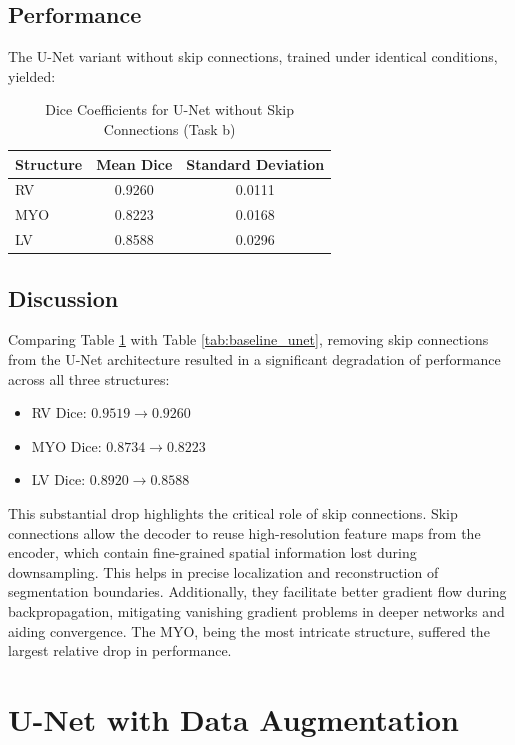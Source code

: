 \documentclass{article}
\begin{document}
\subsection{Performance}
The U-Net variant without skip connections, trained under identical conditions, yielded:
\begin{table}[H]
  \centering
  \caption{Dice Coefficients for U-Net without Skip Connections (Task b)}
  \label{tab:no_shortcut_unet}
  \begin{tabular}{lcc}
    \toprule
    Structure & Mean Dice & Standard Deviation \\
    \midrule
    RV        & 0.9260    & 0.0111             \\
    MYO       & 0.8223    & 0.0168             \\
    LV        & 0.8588    & 0.0296             \\
    \bottomrule
  \end{tabular}
\end{table}

\subsection{Discussion}
Comparing Table \ref{tab:no_shortcut_unet} with Table \ref{tab:baseline_unet}, removing skip connections from the U-Net architecture
resulted in a significant degradation of performance across all three structures:
\begin{itemize}
  \item RV Dice: $0.9519 \rightarrow 0.9260$
  \item MYO Dice: $0.8734 \rightarrow 0.8223$
  \item LV Dice: $0.8920 \rightarrow 0.8588$
\end{itemize}
This substantial drop highlights the critical role of skip connections. Skip connections allow the decoder to reuse high-resolution
feature maps from the encoder, which contain fine-grained spatial information lost during downsampling. This helps in precise
localization and reconstruction of segmentation boundaries. Additionally, they facilitate better gradient flow during backpropagation,
mitigating vanishing gradient problems in deeper networks and aiding convergence. The MYO, being the most intricate structure,
suffered the largest relative drop in performance.



\section{U-Net with Data Augmentation}
\end{document}
